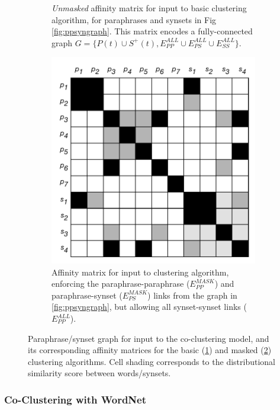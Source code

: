 \documentclass[11pt]{article}
\begin{document}
\begin{figure}[th]
\begin{subfigure}[t]{0.36\textwidth}
		\caption{\textit{Unmasked} affinity matrix for input to basic clustering algorithm, for paraphrases and synsets in Fig \ref{fig:ppsyngraph}. This matrix encodes a fully-connected graph $G = \{P(t) \cup S^+(t), E_{PP}^{ALL} \cup E_{PS}^{ALL} \cup E_{SS}^{ALL} \}$.}
		\label{fig:ppsynmatall}
	\end{subfigure}
	\hfill%
	\begin{subfigure}[t]{0.36\textwidth}
		\includegraphics[width=\textwidth]{images/pp_syn_mat_mask.pdf}
		\caption{Affinity matrix for input to clustering algorithm, enforcing the paraphrase-paraphrase ($E_{PP}^{MASK}$) and paraphrase-synset ($E_{PS}^{MASK}$) links from the graph in \ref{fig:ppsyngraph}, but allowing all synset-synset links ($E_{PP}^{ALL}$). }
		\label{fig:ppsynmatmask}
	\end{subfigure}
	\caption{Paraphrase/synset graph for input to the co-clustering model, and its corresponding affinity matrices for the basic (\ref{fig:ppsynmatall}) and masked (\ref{fig:ppsynmatmask}) clustering algorithms. Cell shading corresponds to the distributional similarity score between words/synsets. }
	\label{fig:cocluster}
\end{figure}


\subsubsection{Co-Clustering with WordNet}
\end{document}
